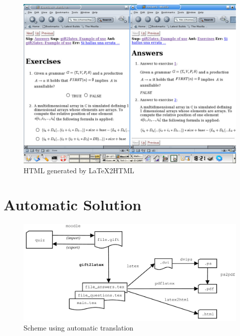 \documentclass{pracjourn}[2006/02/20]
\begin{document}
\begin{figure}[hbt]
  \begin{center}
    \includegraphics[scale=0.3]{gift2html}
  \end{center}
\caption{HTML generated by \LaTeX2HTML{}}
\label{fig:html}
\end{figure}

\section{Automatic Solution}
\label{section:pro}
%

\begin{figure}[!ht]
  \begin{center}
    \includegraphics[scale=0.3]{automatic}
    \caption{Scheme using automatic translation}
    \label{fig:automatic}
  \end{center}
\end{figure}
\end{document}
